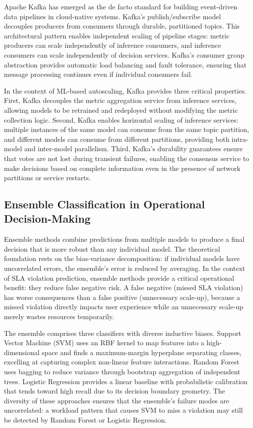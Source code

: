 \documentclass[conference]{IEEEtran}
\begin{document}
Apache Kafka has emerged as the de facto standard for building event-driven data pipelines in cloud-native systems. Kafka's publish/subscribe model decouples producers from consumers through durable, partitioned topics. This architectural pattern enables independent scaling of pipeline stages: metric producers can scale independently of inference consumers, and inference consumers can scale independently of decision services. Kafka's consumer group abstraction provides automatic load balancing and fault tolerance, ensuring that message processing continues even if individual consumers fail.


In the context of ML-based autoscaling, Kafka provides three critical properties. First, Kafka decouples the metric aggregation service from inference services, allowing models to be retrained and redeployed without modifying the metric collection logic. Second, Kafka enables horizontal scaling of inference services: multiple instances of the same model can consume from the same topic partition, and different models can consume from different partitions, providing both intra-model and inter-model parallelism. Third, Kafka's durability guarantees ensure that votes are not lost during transient failures, enabling the consensus service to make decisions based on complete information even in the presence of network partitions or service restarts.

\subsection{Ensemble Classification in Operational Decision-Making}

Ensemble methods combine predictions from multiple models to produce a final decision that is more robust than any individual model. The theoretical foundation rests on the bias-variance decomposition: if individual models have uncorrelated errors, the ensemble's error is reduced by averaging. In the context of SLA violation prediction, ensemble methods provide a critical operational benefit: they reduce false negative risk. A false negative (missed SLA violation) has worse consequences than a false positive (unnecessary scale-up), because a missed violation directly impacts user experience while an unnecessary scale-up merely wastes resources temporarily.

The ensemble comprises three classifiers with diverse inductive biases. Support Vector Machine (SVM) uses an RBF kernel to map features into a high-dimensional space and finds a maximum-margin hyperplane separating classes, excelling at capturing complex non-linear feature interactions. Random Forest uses bagging to reduce variance through bootstrap aggregation of independent trees. Logistic Regression provides a linear baseline with probabilistic calibration that tends toward high recall due to its decision boundary geometry. The diversity of these approaches ensures that the ensemble's failure modes are uncorrelated: a workload pattern that causes SVM to miss a violation may still be detected by Random Forest or Logistic Regression.
\end{document}
